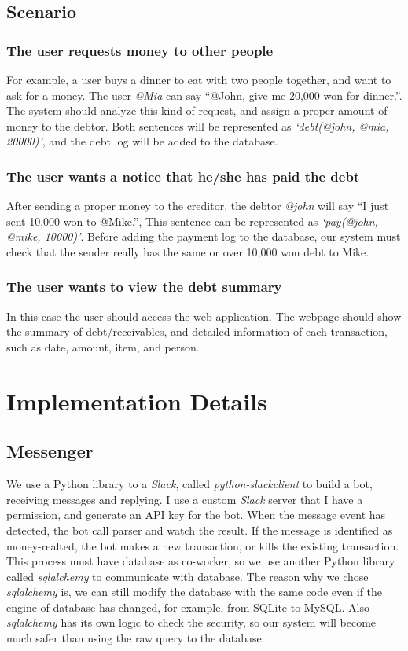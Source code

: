 \documentclass[11pt]{article}
\begin{document}
\subsection{Scenario}
\subsubsection{The user requests money to other people}
For example, a user buys a dinner to eat with two people together,
and want to ask for a money.
The user \textit{@Mia} can say ``@John, give me 20,000 won for dinner.''.
The system should analyze this kind of request,
and assign a proper amount of money to the debtor.
Both sentences will be represented as \textit{`debt(@john, @mia, 20000)'},
and the debt log will be added to the database.

\subsubsection{The user wants a notice that he/she has paid the debt}
After sending a proper money to the creditor,
the debtor \textit{@john} will say ``I just sent 10,000 won to @Mike.'', 
This sentence can be represented as \textit{`pay(@john, @mike, 10000)'}.
Before adding the payment log to the database, our system must check that
the sender really has the same or over 10,000 won debt to Mike.

\subsubsection{The user wants to view the debt summary}
In this case the user should access the web application.
The webpage should show the summary of debt/receivables,
and detailed information of each transaction, such as date, amount, item, and person.


\section{Implementation Details}

\subsection{Messenger}

We use a Python library to a \textit{Slack}, called \textit{python-slackclient}
to build a bot, receiving messages and replying.
I use a custom \textit{Slack} server that I have a permission,
and generate an API key for the bot.
When the message event has detected,
the bot call parser and watch the result.
If the message is identified as money-realted, the bot makes a new transaction,
or kills the existing transaction.
This process must have database as co-worker, so we use another Python library
called \textit{sqlalchemy} to communicate with database.
The reason why we chose \textit{sqlalchemy} is,
we can still modify the database with the same code
even if the engine of database has changed, for example, from SQLite to MySQL.
Also \textit{sqlalchemy} has its own logic to check the security,
so our system will become much safer than using the raw query to the database. 
\end{document}
